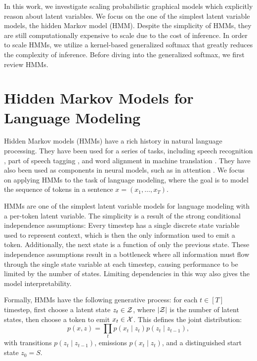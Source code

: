 \documentclass{article}
\begin{document}
In this work, we investigate scaling probabilistic graphical models
which explicitly reason about latent variables.
We focus on the one of the simplest latent variable models,
the hidden Markov model (HMM).
Despite the simplicity of HMMs,
they are still computationally expensive to scale
due to the cost of inference.
In order to scale HMMs, we utilize a kernel-based generalized softmax that greatly
reduces the complexity of inference.
Before diving into the generalized softmax, we first review HMMs.



\section{Hidden Markov Models for Language Modeling}
Hidden Markov models (HMMs) have a rich history in natural language processing.
They have been used for a series of tasks, including
speech recognition \citep{rabiner1990tut},
part of speech tagging \citep{merialdo1994tagging}, 
and word alignment in machine translation \citep{vogel1996hmm}.
They have also been used as components in neural models,
such as in attention \citep{shankar2018posterior}.
We focus on applying HMMs to the task of language modeling,
where the goal is to model the sequence of tokens in a sentence $x = (x_1,\ldots,x_T)$.

HMMs are one of the simplest latent variable models for language modeling
with a per-token latent variable.
The simplicity is a result of the strong conditional independence assumptions:
Every timestep has a single discrete state variable used to represent context,
which is then the only information used to emit a token.
Additionally, the next state is a function of only the previous state.
These independence assumptions result in a bottleneck where all information
must flow through the single state variable at each timestep,
causing performance to be limited by the number of states.
Limiting dependencies in this way also gives the model interpretability.

Formally, HMMs have the following generative process:
for each $t \in [T]$ timestep, first choose a latent state $z_t \in \mathcal{Z}$,
where $|\mathcal{Z}|$ is the number of latent states,
then choose a token to emit $x_t \in \mathcal{X}$.
This defines the joint distribution:
\begin{equation}
\label{eqn:joint}
p(x,z) = \prod_t p(x_t\mid z_t) p(z_t \mid z_{t-1}),
\end{equation}
with transitions $p(z_t \mid z_{t-1})$, emissions $p(x_t \mid z_t)$,
and a distinguished start state $z_0 = S$.
\end{document}
